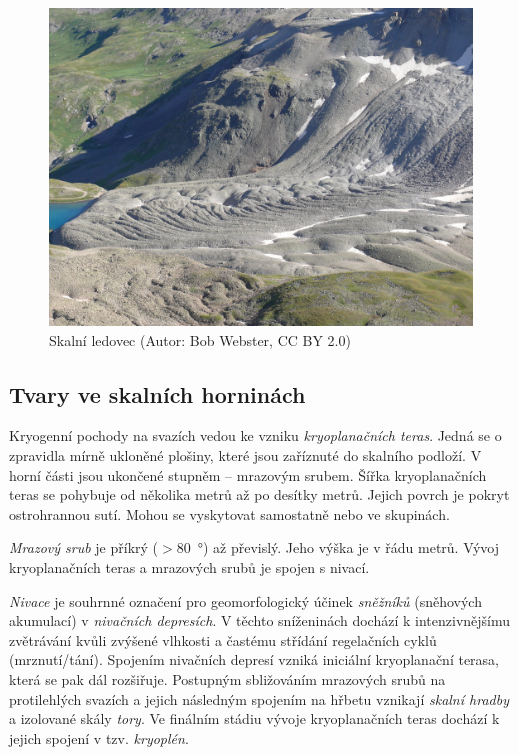 \begin{figure}[t]
	\centering
	\includegraphics[width=1\linewidth]{obrazky/periglac/rock_glac}
	\caption{Skalní ledovec (Autor: Bob Webster, CC BY 2.0)}
	\label{fig:skalni_led}
\end{figure}

\subsection{Tvary ve skalních horninách}
Kryogenní pochody na svazích vedou ke vzniku \emph{kryoplanačních teras}. Jedná se o zpravidla mírně ukloněné plošiny, které jsou zaříznuté do skalního podloží. V horní části jsou ukončené stupněm -- mrazovým srubem. Šířka kryoplanačních teras se pohybuje od několika metrů až po desítky metrů. Jejich povrch je pokryt ostrohrannou sutí. Mohou se vyskytovat samostatně nebo ve skupinách. 

\emph{Mrazový srub} je příkrý ($>$\SI{80}{\degree}) až převislý. Jeho výška je v řádu metrů. Vývoj kryoplanačních teras a mrazových srubů je spojen s nivací. 

\emph{Nivace} je souhrnné označení pro geomorfologický účinek \emph{sněžníků} (sněhových akumulací) v \emph{nivačních depresích}. V těchto sníženinách dochází k intenzivnějšímu zvětrávání kvůli zvýšené vlhkosti a častému střídání regelačních cyklů (mrznutí/tání).  Spojením nivačních depresí vzniká iniciální kryoplanační terasa, která se pak dál rozšiřuje. Postupným sbližováním mrazových srubů na protilehlých svazích a jejich následným spojením na hřbetu vznikají \emph{skalní hradby} a izolované skály \emph{tory}. Ve finálním stádiu vývoje kryoplanačních teras dochází k jejich spojení v tzv. \emph{kryoplén}.

